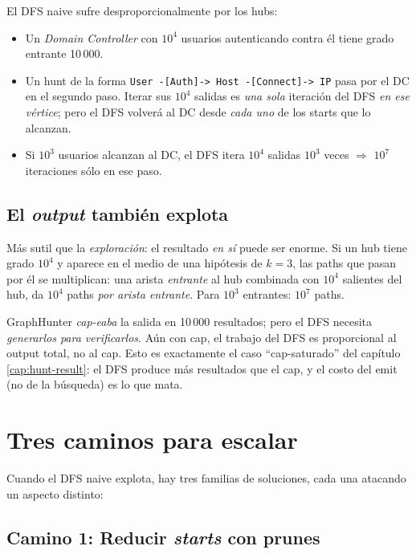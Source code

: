 \noindent
El DFS naive sufre desproporcionalmente por los hubs:

\begin{itemize}
    \item Un \emph{Domain Controller} con \(10^4\) usuarios
    autenticando contra él tiene grado entrante 10\,000.
    \item Un hunt de la forma
    \texttt{User -[Auth]-> Host -[Connect]-> IP} pasa por el DC en
    el segundo paso. Iterar sus \(10^4\) salidas es \emph{una sola}
    iteración del DFS \emph{en ese vértice}; pero el DFS volverá al
    DC desde \emph{cada uno} de los starts que lo alcanzan.
    \item Si \(10^3\) usuarios alcanzan al DC, el DFS itera
    \(10^4\) salidas \(10^3\) veces \(\Rightarrow\) \(10^7\)
    iteraciones sólo en ese paso.
\end{itemize}

\subsection{El \emph{output} también explota}

Más sutil que la \emph{exploración}: el resultado \emph{en sí}
puede ser enorme. Si un hub tiene grado \(10^4\) y aparece en el
medio de una hipótesis de \(k = 3\), las paths que pasan por él se
multiplican: una arista \emph{entrante} al hub combinada con
\(10^4\) salientes del hub, da \(10^4\) paths \emph{por arista
entrante}. Para \(10^3\) entrantes: \(10^7\) paths.

GraphHunter \emph{cap-eaba} la salida en 10\,000 resultados; pero
el DFS necesita \emph{generarlos para verificarlos}. Aún con cap,
el trabajo del DFS es proporcional al output total, no al cap.
Esto es exactamente el caso ``cap-saturado'' del capítulo
\ref{cap:hunt-result}: el DFS produce más resultados que el cap, y
el costo del emit (no de la búsqueda) es lo que mata.

\section{Tres caminos para escalar}

Cuando el DFS naive explota, hay tres familias de soluciones, cada
una atacando un aspecto distinto:

\subsection{Camino 1: Reducir \emph{starts} con prunes}

